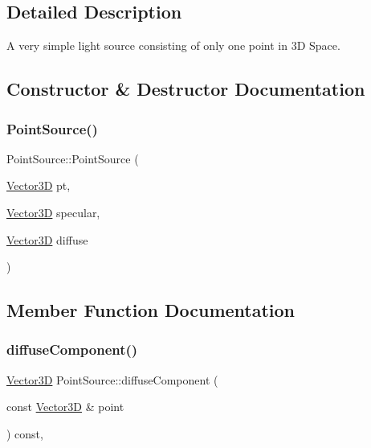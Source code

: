 \subsection{Detailed Description}
A very simple light source consisting of only one point in 3D Space. 

\subsection{Constructor \& Destructor Documentation}
\mbox{\label{classPointSource_a45ecabcd8c8aab5cc5bcaa88a0357d58}} 
\subsubsection{\texorpdfstring{PointSource()}{PointSource()}}
{\footnotesize\ttfamily Point\+Source\+::\+Point\+Source (\begin{DoxyParamCaption}\item[{\mbox{\hyperlink{classVector3D}{Vector3D}}}]{pt,  }\item[{\mbox{\hyperlink{classVector3D}{Vector3D}}}]{specular,  }\item[{\mbox{\hyperlink{classVector3D}{Vector3D}}}]{diffuse }\end{DoxyParamCaption})}



\subsection{Member Function Documentation}
\mbox{\label{classPointSource_a445e9566d2226d1b8afd76274fb006fb}} 
\subsubsection{\texorpdfstring{diffuseComponent()}{diffuseComponent()}}
{\footnotesize\ttfamily \mbox{\hyperlink{classVector3D}{Vector3D}} Point\+Source\+::diffuse\+Component (\begin{DoxyParamCaption}\item[{const \mbox{\hyperlink{classVector3D}{Vector3D}} \&}]{point }\end{DoxyParamCaption}) const\hspace{0.3cm}{\ttfamily [override]}, {\ttfamily [virtual]}}



